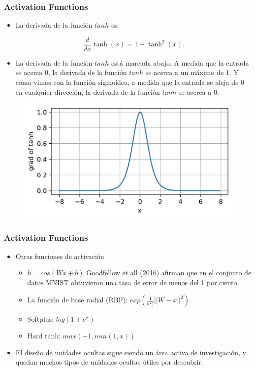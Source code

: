 \documentclass[
  shownotes,
  xcolor={svgnames},
  hyperref={colorlinks,citecolor=DarkBlue,linkcolor=DarkRed,urlcolor=DarkBlue}
  , aspectratio=169]{beamer}
\begin{document}
\begin{frame}
\frametitle{Activation Functions}

\begin{itemize}
\item La derivada de la función $tanh$ es:

$$\frac{d}{dx} \operatorname{tanh}(x) = 1 - \operatorname{tanh}^2(x).$$

\item La derivada de la función $tanh$ está marcada abajo. A medida que la entrada se acerca 0, la derivada de la función $tanh$  se acerca a un máximo de 1. Y como vimos con la función sigmoidea, a medida que la entrada se aleja de 0 en cualquier dirección, la derivada de la función $tanh$ se acerca a 0.
\end{itemize}


  \begin{figure}[H] \centering
            \captionsetup{justification=centering}
              \includegraphics[scale=0.45]{figures/tanh_dev}
              
 \end{figure}



\end{frame}
\begin{frame}
\frametitle{Activation Functions}


\begin{itemize}
\item Otras funciones de activación
\medskip
\begin{itemize}
\item $h=cos(W x+b)$ Goodfellow et all (2016) afirman que en el conjunto de datos MNIST obtuvieron una tasa de error de menos del 1 por ciento
\medskip
\item La función de base radial (RBF): $exp\left( \frac{1}{\sigma^2)}||W-x||^2 \right)$
\medskip
\item Softplus: $log(1+e^x)$
\medskip
\item Hard tanh: $max(-1,min(1,x))$
\medskip
\end{itemize}
\item El diseño de unidades ocultas sigue siendo un área activa de investigación, y quedan muchos tipos de unidades ocultas útiles por descubrir.
\end{itemize}


\end{frame}
\end{document}
